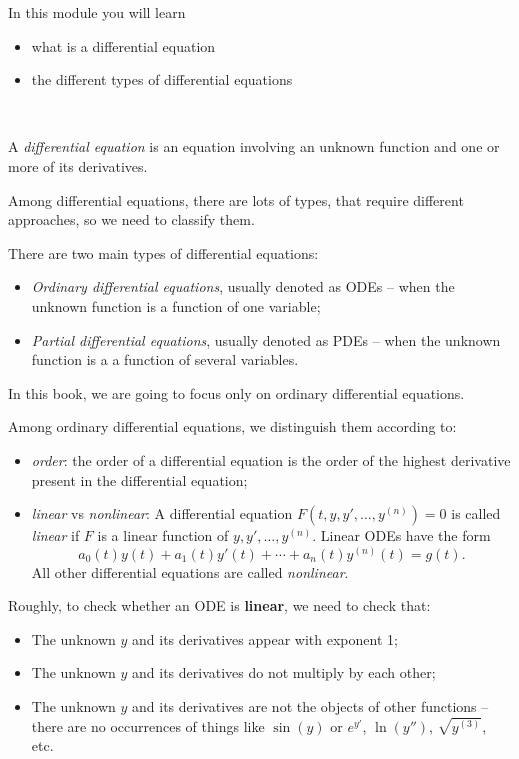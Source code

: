 In this module you will learn
\begin{itemize}
	\item what is a differential equation
	\item the different types of differential equations
\end{itemize}

\hfill \\[-10pt]


\begin{definition}
	A \emph{differential equation} is an equation involving an unknown function and one or more of its derivatives.
\end{definition}


Among differential equations, there are lots of types, that require different approaches, so we need to classify them.

\begin{definition}
	There are two main types of differential equations:
	\begin{itemize}
		\item \emph{Ordinary differential equations}, usually denoted as ODEs -- when the unknown function is a function of one variable;
		\item \emph{Partial differential equations}, usually denoted as PDEs -- when the unknown function is a a function of several variables.
	\end{itemize}	
	
	In this book, we are going to focus only on ordinary differential equations.
	
	Among ordinary differential equations, we distinguish them according to:
	\begin{itemize}
		\item \emph{order}: the order of a differential equation is the order of the highest derivative present in the differential equation;
		\item \emph{linear} vs \emph{nonlinear}: A differential equation \quad $F(t,y,y',\ldots,y^{(n)}) = 0$ \quad is called \emph{linear} if $F$ is a linear function of $y, y', \ldots, y^{(n)}$. Linear ODEs have the form
			$$ a_0(t) y(t) + a_1(t) y'(t) + \cdots + a_n(t) y^{(n)}(t) = g(t). $$
			All other differential equations are called \emph{nonlinear}.
	\end{itemize}
\end{definition}

\begin{graybox}
	Roughly, to check whether an ODE is \textbf{linear}, we need to check that:
	\begin{itemize}
		\item The unknown $y$ and its derivatives appear with exponent 1;
		\item The unknown $y$ and its derivatives do not multiply by each other;
		\item The unknown $y$ and its derivatives are not the objects of other functions -- there are no occurrences of things like $\sin(y)$ or $e^{y'}$, $\ln(y'')$, $\sqrt{y^{(3)}}$, etc.
	\end{itemize}
\end{graybox}


